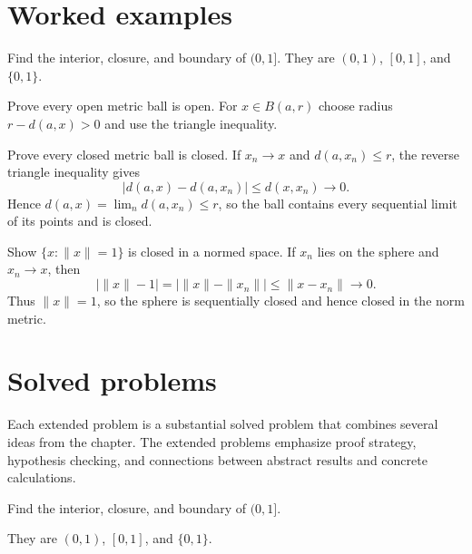 \section{Worked examples}

\begin{example}\label{ex:ii04-worked-01}
Find the interior, closure, and boundary of $(0,1]$. They are $(0,1)$, $[0,1]$, and $\{0,1\}$.
\end{example}

\begin{example}\label{ex:ii04-worked-02}
Prove every open metric ball is open. For $x\in B(a,r)$ choose radius $r-d(a,x)>0$ and use the triangle inequality.
\end{example}

\begin{example}\label{ex:ii04-worked-03}
Prove every closed metric ball is closed. If $x_n\to x$ and
$d(a,x_n)\le r$, the reverse triangle inequality gives
\[
|d(a,x)-d(a,x_n)|\le d(x,x_n)\to0.
\]
Hence $d(a,x)=\lim_n d(a,x_n)\le r$, so the ball contains every sequential limit of its points and is closed.
\end{example}

\begin{example}\label{ex:ii04-worked-04}
Show $\{x:\|x\|=1\}$ is closed in a normed space. If $x_n$ lies on the sphere and $x_n\to x$, then
\[
\bigl|\|x\|-1\bigr|=\bigl|\|x\|-\|x_n\|\bigr|\le\|x-x_n\|\to0.
\]
Thus $\|x\|=1$, so the sphere is sequentially closed and hence closed in the norm metric.
\end{example}

\section{Solved problems}
Each extended problem is a substantial solved problem that combines several ideas from the chapter. The extended problems emphasize proof strategy, hypothesis checking, and connections between abstract results and concrete calculations.

\begin{problem}\label{prob:ii04-problem-01}
Find the interior, closure, and boundary of $(0,1]$.
\end{problem}
\begin{solution}
They are $(0,1)$, $[0,1]$, and $\{0,1\}$.
\end{solution}

